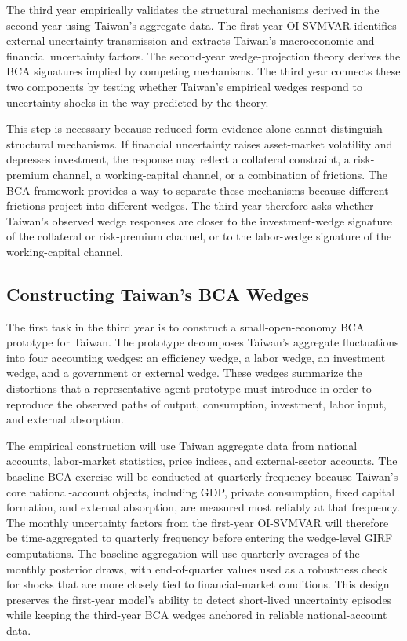\documentclass[12pt]{article}
\begin{document}
The third year empirically validates the structural mechanisms derived in the second year using
Taiwan's aggregate data. The first-year OI-SVMVAR identifies external uncertainty transmission
and extracts Taiwan's macroeconomic and financial uncertainty factors. The second-year
wedge-projection theory derives the BCA signatures implied by competing mechanisms. The
third year connects these two components by testing whether Taiwan's empirical wedges respond
to uncertainty shocks in the way predicted by the theory.

This step is necessary because reduced-form evidence alone cannot distinguish structural
mechanisms. If financial uncertainty raises asset-market volatility and depresses investment, the
response may reflect a collateral constraint, a risk-premium channel, a working-capital channel,
or a combination of frictions. The BCA framework provides a way to separate these mechanisms
because different frictions project into different wedges. The third year therefore asks whether
Taiwan's observed wedge responses are closer to the investment-wedge signature of the collateral
or risk-premium channel, or to the labor-wedge signature of the working-capital channel.

\subsection{Constructing Taiwan's BCA Wedges}

The first task in the third year is to construct a small-open-economy BCA prototype for Taiwan.
The prototype decomposes Taiwan's aggregate fluctuations into four accounting wedges: an
efficiency wedge, a labor wedge, an investment wedge, and a government or external wedge. These
wedges summarize the distortions that a representative-agent prototype must introduce in order
to reproduce the observed paths of output, consumption, investment, labor input, and external
absorption.

The empirical construction will use Taiwan aggregate data from national accounts, labor-market
statistics, price indices, and external-sector accounts. The baseline BCA exercise will be
conducted at quarterly frequency because Taiwan's core national-account objects, including GDP,
private consumption, fixed capital formation, and external absorption, are measured most
reliably at that frequency. The monthly uncertainty factors from the first-year OI-SVMVAR will
therefore be time-aggregated to quarterly frequency before entering the wedge-level GIRF computations. The baseline aggregation will use quarterly averages of the monthly posterior draws,
with end-of-quarter values used as a robustness check for shocks that are more closely tied to
financial-market conditions. This design preserves the first-year model's ability to detect
short-lived uncertainty episodes while keeping the third-year BCA wedges anchored in reliable
national-account data.
\end{document}
